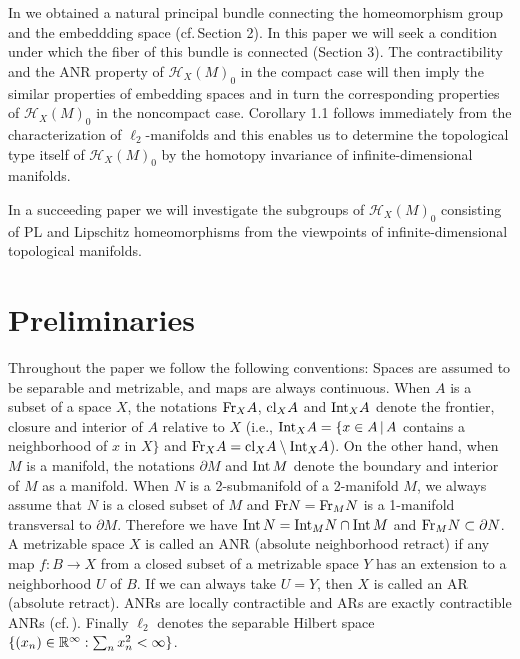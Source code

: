 \documentclass[11pt]{amsart}
\theoremstyle{definition}
\newtheorem*{Proof of Theorem 3.1}{Proof of Theorem 3.1}
\newtheorem*{Proof of Corollary 3.1}{Proof of Corollary 3.1}
\newtheorem*{Proof of Proposition 4.1.(1)}{Proof of Proposition 4.1.(1)}
\newtheorem*{Proof of Proposition 4.1.(2)}{Proof of Proposition 4.1.(2)}
\newtheorem*{Proof of Corollary 1.1}{Proof of Corollary 1.1}
\def \cal {\mathcal}
\begin{document}
In \cite{Ya} we obtained a natural principal bundle connecting the homeomorphism group and the embeddding space (cf.\,Section 2). In this paper we will seek a condition under which the fiber of this bundle is connected (Section 3). The contractibility and the ANR property of ${\cal H}_X(M)_0$ in the compact case will then imply the similar properties of embedding spaces and in turn the corresponding properties of ${\cal H}_X(M)_0$ in the noncompact case. Corollary 1.1 follows immediately from the characterization of $\ell_2$-manifolds and this enables us to determine the topological type itself of ${\cal H}_X(M)_0$ by the homotopy invariance of infinite-dimensional manifolds.

In a succeeding paper we will investigate the subgroups of ${\cal H}_X(M)_0$ consisting of PL and Lipschitz homeomorphisms  from the viewpoints of infinite-dimensional topological manifolds. 

\section{Preliminaries}

Throughout the paper we follow the following conventions: Spaces are assumed to be separable and metrizable, and maps are always continuous. When $A$ is a subset of a space $X$, the notations ${\rm Fr}_X A$, ${\rm cl}_X A$ and ${\rm Int}_X A$ denote the frontier, closure and interior of $A$ relative to $X$ (i.e., ${\rm Int}_X A = \{ x \in A \, | \, A$ contains a neighborhood of $x$ in $X \}$ and ${\rm Fr}_X A = {\rm cl}_X A \setminus {\rm Int}_X A$). On the other hand, when $M$ is a manifold, the notations $\partial M$ and ${\rm Int}\,M$ denote the boundary and interior of $M$ as a manifold. 
When $N$ is a 2-submanifold of a 2-manifold $M$, we always assume that $N$ is a closed subset of $M$ and ${\rm Fr} N = {\rm Fr}_M N$ is a 1-manifold transversal to $\partial M$. Therefore we have ${\rm Int}\,N = {\rm Int}_M N \cap {\rm Int}\,M$ and ${\rm Fr}_M N \subset \partial N$. 
A metrizable space $X$ is called an ANR (absolute neighborhood retract) if any map $f : B \to X$ from a closed subset of a metrizable space $Y$ has an extension to a neighborhood $U$ of $B$. If we can always take $U = Y$, then $X$ is called an AR (absolute retract). ANRs are locally contractible and ARs are exactly contractible ANRs (cf.\,\cite{Hu}). Finally $\ell_2$ denotes the separable Hilbert space $\{ (x_n) \in {\Bbb R}^\infty : \sum_n x_n^2 < \infty \}$. 
\end{document}
